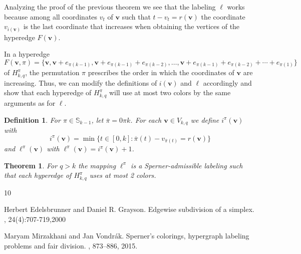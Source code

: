 \documentclass[12pt]{article}
\newtheorem{theorem}{Theorem}
\newtheorem{definition}{Definition}
\begin{document}
Analyzing the proof of the previous theorem we see that the labeling $\ell$ works because among all coordinates $v_t$ of $\bm{v}$ such that $t-v_t=r(\bm{v})$ the coordinate $v_{i(\bm{v})}$ is the last coordinate that increases when obtaining the vertices of the hyperedge $F(\bm{v})$.

In a hyperedge 
\[F(\bm{v},\pi)=\{\bm{v},\bm{v}+e_{\pi(k-1)},\bm{v}+e_{\pi(k-1)}+e_{\pi(k-2)},\ldots,\bm{v}+e_{\pi(k-1)}+e_{\pi(k-2)}+\cdots+e_{\pi(1)}\}\]
of $H_{k,q}^\pi$, the permutation $\pi$ prescribes the order in which the coordinates of $\bm{v}$ are increasing.
 Thus, we can modify the definitions of $i(\bm{v})$ and $\ell$ accordingly and show that each hyperedge of $H_{k,q}^\pi$ will use at most two colors by the same arguments as for $\ell$.

\begin{definition} For $\pi\in\mathbb {S}_{k-1}$, let $\overline\pi=0\pi k$. For each $\bm{v}\in V_{k,q}$ we define $i^\pi(\bm{v})$ with 
\[i^\pi(\bm{v})=\min\{t\in[0,k]:\overline\pi(t)-v_{\overline\pi(t)}=r(\bm{v})\}\]
and $\ell^\pi(\bm{v})$ with $\ell^\pi(\bm{v})=i^\pi(\bm{v})+1$. 
\end{definition}

\begin{theorem}
For $q>k$ the mapping $\ell^\pi$ is a Sperner-admissible labeling such that each hyperedge of $H_{k,q}^\pi$ uses at most 2 colors.
\end{theorem}



\begin{thebibliography}{10}


Herbert Edelsbrunner  and Daniel R. Grayson.
\newblock Edgewise subdivision of a simplex.
, 24(4):707-719,2000


Maryam Mirzakhani and Jan Vondr{\'{a}}k.
\newblock Sperner's colorings, hypergraph labeling problems and fair division.
, 873--886, 2015.



\end{thebibliography}
\end{document}
